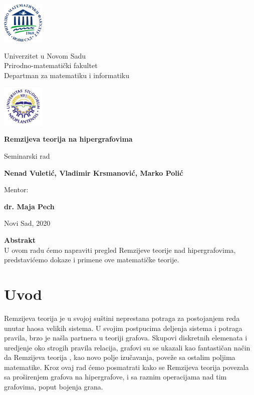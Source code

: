 \documentclass[a4paper]{article}
\newcommand{\autor}{ \centering Nenad Vuletić, Vladimir Krsmanović, Marko Polić}
\newcommand{\naslov}{Remzijeva teorija na hipergrafovima}
\newcommand{\datum}{Novi Sad, 2020}
\newcommand{\mentor}{dr. Maja Pech}
\begin{document}
	\begin{center}
		
		\includegraphics[width=2cm]{grbPMF}\hfill
		\parbox[b]{45ex}{\centering 
			Univerzitet u Novom Sadu\\
			Prirodno-matematički fakultet\\
			Departman za matematiku i informatiku}\hfill 
		\includegraphics[width=2cm]{grbUNS}
		
		\vspace{22ex}
				
		{\Huge {\bf \setlength{\baselineskip}{1.5\baselineskip}\naslov}}
		
		\vspace{4ex}
		Seminarski rad
		
		\vspace{12ex}
		\parbox[b]{\textwidth}{{\Large {\bf \hspace{1cm}\autor}}}
		\vspace{10ex}
		
		{\Large Mentor:}
		
		{\Large  \textbf{\mentor}}
		
		\vfill
		
		\datum
		
	\end{center}
	\thispagestyle{empty}
	\newpage	
	\vfill
	\begin{center}
		\textbf{Abstrakt}\\
		U ovom radu ćemo napraviti pregled Remzijeve teorije nad hipergrafovima, predstavićemo dokaze i primene ove matematičke teorije.
		\thispagestyle{empty}
	\end{center}
	\pagebreak
	\tableofcontents
	\newpage
	\section{Uvod}
	Remzijeva teorija je u svojoj suštini neprestana potraga za postojanjem reda unutar haosa velikih sistema. U svojim postpucima deljenja sistema i potraga pravila, brzo je našla partnera u teoriji grafova. Skupovi diskretnih elemenata i uredjenje oko strogih pravila relacija, grafovi su se ukazali kao fantastičan način da Remzijeva teorija , kao novo polje izučavanja, poveže sa ostalim poljima matematike. Kroz ovaj rad ćemo posmatrati kako se Remzijeva teorija povezala sa proširenjem grafova na hipergrafove, i sa raznim operacijama nad tim grafovima, poput bojenja grana.
\end{document}
